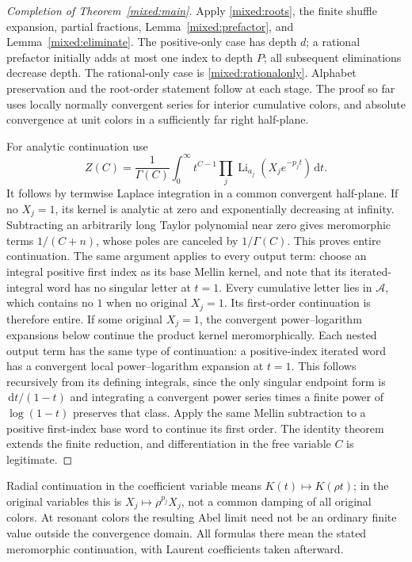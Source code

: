 \documentclass[11pt]{article}
\numberwithin{equation}{section}
\theoremstyle{plain}
\theoremstyle{definition}
\theoremstyle{remark}
\DeclareMathOperator{\Li}{Li}
\newcommand{\dd}{\,\mathrm d}
\begin{document}
\begin{proof}[Completion of Theorem~\ref{mixed:main}]
Apply \eqref{mixed:roots}, the finite shuffle expansion, partial
fractions, Lemma~\ref{mixed:prefactor}, and
Lemma~\ref{mixed:eliminate}. The positive-only case has depth $d$;
a rational prefactor initially adds at most one index to depth $P$;
all subsequent eliminations decrease depth. The rational-only case is
\eqref{mixed:rationalonly}. Alphabet preservation and the root-order
statement follow at each stage. The proof so far uses locally normally
convergent series for interior cumulative colors, and absolute
convergence at unit colors in a sufficiently far right half-plane.

For analytic continuation use
\begin{equation}\label{mixed:Mellin}
 Z(C)=\frac1{\Gamma(C)}\int_0^\infty
                   t^{C-1}\prod_j\Li_{a_j}(X_je^{-p_jt})\dd t.
\end{equation}
It follows by termwise Laplace integration in a common convergent
half-plane. If no $X_j=1$, its kernel is analytic at zero and
exponentially decreasing at infinity. Subtracting an arbitrarily long
Taylor polynomial near zero gives meromorphic terms $1/(C+n)$,
whose poles are canceled by $1/\Gamma(C)$. This proves entire
continuation. The same argument applies to every output term: choose
an integral positive first index as its base Mellin kernel, and note
that its iterated-integral word has no singular letter at $t=1$.
Every cumulative letter lies in $\mathcal A$, which contains no $1$
when no original $X_j=1$. Its first-order continuation is therefore
entire. If some original $X_j=1$, the convergent power--logarithm
expansions below continue the product kernel meromorphically. Each
nested output term has the same type of continuation: a positive-index
iterated word has a convergent local power--logarithm expansion at
$t=1$. This follows recursively from its defining integrals, since
the only singular endpoint form is $\dd t/(1-t)$ and integrating a
convergent power series times a finite power of $\log(1-t)$ preserves
that class. Apply the same Mellin subtraction to a positive first-index
base word to continue its first order. The identity theorem extends
the finite reduction, and differentiation in the
free variable $C$ is legitimate.
\end{proof}

Radial continuation in the coefficient variable means $K(t)\mapsto
K(\rho t)$; in the original variables this is
$X_j\mapsto\rho^{p_j}X_j$, not a common damping of all original
colors. At resonant colors the resulting Abel limit need not be an
ordinary finite value outside the convergence domain. All formulas
there mean the stated meromorphic continuation, with Laurent
coefficients taken afterward.
\end{document}
